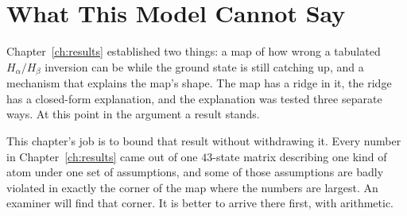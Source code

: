 %
%
%

\chapter{What This Model Cannot Say}
\label{ch:limits}

Chapter~\ref{ch:results} established two things: a map of how wrong a
tabulated $H_\alpha/H_\beta$ inversion can be while the ground state is still
catching up, and a mechanism that explains the map's shape. The map has a ridge
in it, the ridge has a closed-form explanation, and the explanation was tested
three separate ways. At this point in the argument a result stands.

This chapter's job is to bound that result without withdrawing it. Every number
in Chapter~\ref{ch:results} came out of one $43$-state matrix describing one
kind of atom under one set of assumptions, and some of those assumptions are
badly violated in exactly the corner of the map where the numbers are largest.
An examiner will find that corner. It is better to arrive there first, with
arithmetic.

